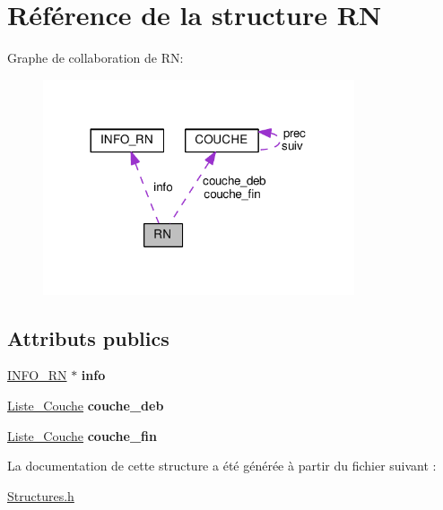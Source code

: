 \hypertarget{structRN}{}\section{Référence de la structure RN}
\label{structRN}


Graphe de collaboration de RN\+:
\nopagebreak
\begin{figure}[H]
\begin{center}
\leavevmode
\includegraphics[width=260pt]{structRN__coll__graph}
\end{center}
\end{figure}
\subsection*{Attributs publics}
\begin{DoxyCompactItemize}
\item 
\hyperlink{structINFO__RN}{I\+N\+F\+O\+\_\+\+RN} $\ast$ {\bfseries info}\hypertarget{structRN_a6e638d06aa8ad842d9b7e866f8a0e749}{}\label{structRN_a6e638d06aa8ad842d9b7e866f8a0e749}

\item 
\hyperlink{structCOUCHE}{Liste\+\_\+\+Couche} {\bfseries couche\+\_\+deb}\hypertarget{structRN_a7819ca58c5af68054e17881d5189edb2}{}\label{structRN_a7819ca58c5af68054e17881d5189edb2}

\item 
\hyperlink{structCOUCHE}{Liste\+\_\+\+Couche} {\bfseries couche\+\_\+fin}\hypertarget{structRN_a587292a48a2d40ee63c00b1e0162e9e2}{}\label{structRN_a587292a48a2d40ee63c00b1e0162e9e2}

\end{DoxyCompactItemize}


La documentation de cette structure a été générée à partir du fichier suivant \+:\begin{DoxyCompactItemize}
\item 
\hyperlink{Structures_8h}{Structures.\+h}\end{DoxyCompactItemize}
